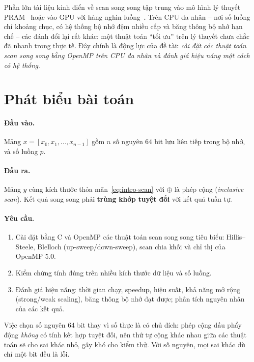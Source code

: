 Phần lớn tài liệu kinh điển về scan song song tập trung vào mô hình lý thuyết
PRAM~\cite{blelloch1990,ladner1980} hoặc vào GPU với hàng nghìn
luồng~\cite{harris2007,merrill2016}. Trên CPU đa nhân -- nơi số luồng chỉ khoảng chục, có hệ
thống bộ nhớ đệm nhiều cấp và băng thông bộ nhớ hạn chế -- các đánh đổi lại rất khác: một thuật
toán ``tối ưu'' trên lý thuyết chưa chắc đã nhanh trong thực tế. Đây chính là động lực của đề
tài: \emph{cài đặt các thuật toán scan song song bằng OpenMP trên CPU đa nhân và đánh giá hiệu
năng một cách có hệ thống}.

\section{Phát biểu bài toán}

\paragraph{Đầu vào.} Mảng \(x = [x_0, x_1, \ldots, x_{n-1}]\) gồm \(n\) số nguyên 64 bit lưu
liên tiếp trong bộ nhớ, và số luồng \(p\).

\paragraph{Đầu ra.} Mảng \(y\) cùng kích thước thỏa mãn~\eqref{eq:intro-scan} với \(\oplus\)
là phép cộng (\emph{inclusive scan}). Kết quả song song phải \textbf{trùng khớp tuyệt đối} với
kết quả tuần tự.

\paragraph{Yêu cầu.}
\begin{enumerate}
  \item Cài đặt bằng C và OpenMP các thuật toán scan song song tiêu biểu: Hillis--Steele,
        Blelloch (up-sweep/down-sweep), scan chia khối và chỉ thị  của OpenMP 5.0.
  \item Kiểm chứng tính đúng trên nhiều kích thước dữ liệu và số luồng.
  \item Đánh giá hiệu năng: thời gian chạy, speedup, hiệu suất, khả năng mở rộng (strong/weak
        scaling), băng thông bộ nhớ đạt được; phân tích nguyên nhân của các kết quả.
\end{enumerate}

Việc chọn số nguyên 64 bit thay vì số thực là có chủ đích: phép cộng dấu phẩy động
\emph{không} có tính kết hợp tuyệt đối, nên thứ tự cộng khác nhau giữa các thuật toán sẽ cho
sai khác nhỏ, gây khó cho kiểm thử. Với số nguyên, mọi sai khác dù chỉ một bit đều là lỗi.

